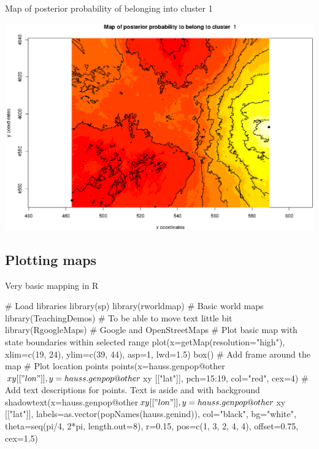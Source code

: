 \documentclass[compress, ucs, xelatex, 11pt, xcolor=svgnames,
  hyperref={
    bookmarks=true,
    unicode=true,
    colorlinks=true,
    pdftitle={Molecular data in R},
    plainpages=false,
    pdfauthor={Vojtech Zeisek},
    pdfsubject={Course about phylogeny and evolution in R},
    pdfcreator={XeLaTeX},
    pdfkeywords={R, evolution, phylogeny, molecular data},
    linkcolor=Tomato,
    anchorcolor=SaddleBrown,
    citecolor=Goldenrod,
    filecolor=DarkMagenta,
    menucolor=Sienna,
    urlcolor=DarkTurquoise,
    pdftex},
  url={hyphens, lowtilde} %
  ]{beamer}
\begin{document}
\begin{frame}{Map of posterior probability of belonging into cluster 1}
  \begin{center}
    \includegraphics[width=\textwidth-1.5cm]{geneland2.png}
  \end{center}
\end{frame}

\subsection{Plotting maps}

\begin{frame}[fragile]{Very basic mapping in R}
  \begin{spluscode}
    # Load libraries
    library(sp)
    library(rworldmap) # Basic world maps
    library(TeachingDemos) # To be able to move text little bit
    library(RgoogleMaps) # Google and OpenStreetMaps
    # Plot basic map with state boundaries within selected range
    plot(x=getMap(resolution="high"), xlim=c(19, 24), ylim=c(39, 44),
      asp=1, lwd=1.5)
    box() # Add frame around the map
    # Plot location points
    points(x=hauss.genpop@other$xy[["lon"]], y=hauss.genpop@other$xy
      [["lat"]], pch=15:19, col="red", cex=4)
    # Add text descriptions for points. Text is aside and with background
    shadowtext(x=hauss.genpop@other$xy[["lon"]], y=hauss.genpop@other$xy
      [["lat"]], labels=as.vector(popNames(hauss.genind)), col="black",
      bg="white", theta=seq(pi/4, 2*pi, length.out=8), r=0.15,
      pos=c(1, 3, 2, 4, 4), offset=0.75, cex=1.5)
  \end{spluscode}
\end{frame}
\end{document}
